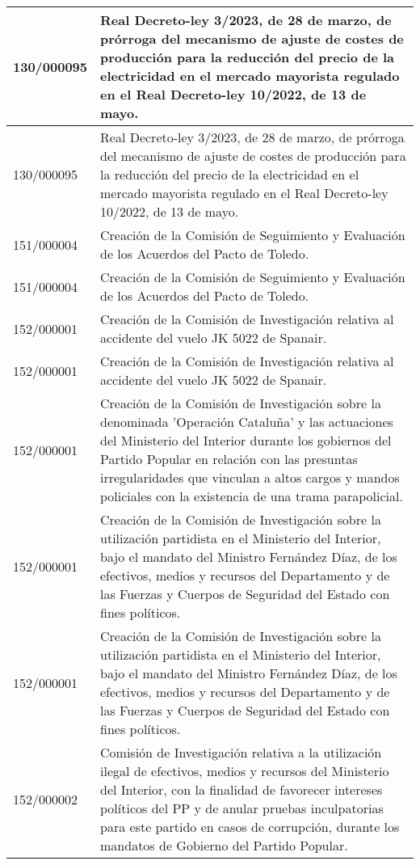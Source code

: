 {\begin{table}[H]
\begin{center}
\begin{tabularx}{\linewidth}{| l | X |}
\hline
130/000095 & Real Decreto-ley 3/2023, de 28 de marzo, de prórroga del mecanismo de ajuste de costes de producción para la reducción del precio de la electricidad en el mercado mayorista regulado en el Real Decreto-ley 10/2022, de 13 de mayo. \\
\hline
130/000095 & Real Decreto-ley 3/2023, de 28 de marzo, de prórroga del mecanismo de ajuste de costes de producción para la reducción del precio de la electricidad en el mercado mayorista regulado en el Real Decreto-ley 10/2022, de 13 de mayo. \\
\hline
151/000004 & Creación de la Comisión de Seguimiento y Evaluación de los Acuerdos del Pacto de Toledo. \\
\hline
151/000004 & Creación de la Comisión de Seguimiento y Evaluación de los Acuerdos del Pacto de Toledo. \\
\hline
152/000001 & Creación de la Comisión de Investigación relativa al accidente del vuelo JK 5022 de Spanair. \\
\hline
152/000001 & Creación de la Comisión de Investigación relativa al accidente del vuelo JK 5022 de Spanair. \\
\hline
152/000001 & Creación de la Comisión de Investigación sobre la denominada 'Operación Cataluña' y las actuaciones del Ministerio del Interior durante los gobiernos del Partido Popular en relación con las presuntas irregularidades que vinculan a altos cargos y mandos policiales con la existencia de una trama parapolicial. \\
\hline
152/000001 & Creación de la Comisión de Investigación sobre la utilización partidista en el Ministerio del Interior, bajo el mandato del Ministro Fernández Díaz, de los efectivos, medios y recursos del Departamento y de las Fuerzas y Cuerpos de Seguridad del Estado con fines políticos. \\
\hline
152/000001 & Creación de la Comisión de Investigación sobre la utilización partidista en el Ministerio del Interior, bajo el mandato del Ministro Fernández Díaz, de los efectivos, medios y recursos del Departamento y de las Fuerzas y Cuerpos de Seguridad del Estado con fines políticos. \\
\hline
152/000002 & Comisión de Investigación relativa a la utilización ilegal de efectivos, medios y recursos del Ministerio del Interior, con la finalidad de favorecer intereses políticos del PP y de anular pruebas inculpatorias para este partido en casos de corrupción, durante los mandatos de Gobierno del Partido Popular. \\

\end{tabularx}
\end{center}
\end{table}}
